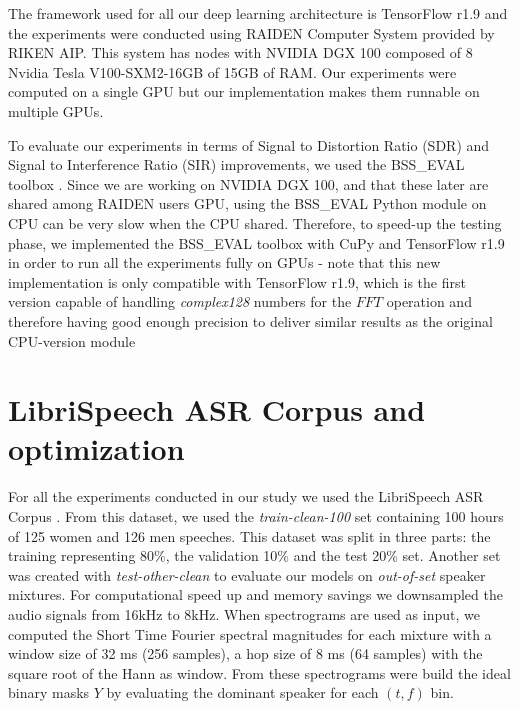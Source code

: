 \documentclass[master, tikz, final,11pt, dvipdfmx]{iscs-thesis}
\begin{document}
The framework used for all our deep learning architecture is TensorFlow r1.9 \cite{TF} and the experiments were conducted using RAIDEN Computer System provided by RIKEN AIP. This system has nodes with NVIDIA DGX 100 composed of 8 Nvidia Tesla V100-SXM2-16GB of 15GB of RAM. Our experiments were computed on a single GPU but our implementation makes them runnable on multiple GPUs. 

To evaluate our experiments in terms of Signal to Distortion Ratio (SDR) and Signal to Interference Ratio (SIR) improvements, we used the BSS\_EVAL toolbox \cite{BSS}. Since we are working on NVIDIA DGX 100, and that these later are shared among RAIDEN users GPU, using the BSS\_EVAL Python module on CPU can be  very slow when the CPU shared. Therefore, to speed-up the testing phase, we implemented the BSS\_EVAL toolbox with CuPy \cite{cupy} and TensorFlow r1.9 in order to run all the experiments fully on GPUs - note that this new implementation is only compatible with TensorFlow r1.9, which is the first version capable of handling \textit{complex128} numbers for the $FFT$ operation and therefore having good enough precision to deliver similar results as the original CPU-version module

\section{LibriSpeech ASR Corpus and optimization}

For all the experiments conducted in our study we used the LibriSpeech ASR Corpus \cite{LIBRI}. From this dataset, we used the \textit{train-clean-100} set containing 100 hours of 125 women and 126 men speeches. This dataset was split in three parts: the training representing 80\%, the validation 10\% and the test 20\% set. Another set was created with \textit{test-other-clean} to evaluate our models on \textit{out-of-set} speaker mixtures. For computational speed up and memory savings we downsampled the audio signals from 16kHz to 8kHz.
When spectrograms are used as input, we computed the Short Time Fourier spectral magnitudes for each mixture with a window size of 32 ms (256 samples), a hop size of 8 ms (64 samples) with the square root of the Hann as window. From these spectrograms were build the ideal binary masks $Y$ by evaluating the dominant speaker for each $(t,f)$ bin.
\end{document}
